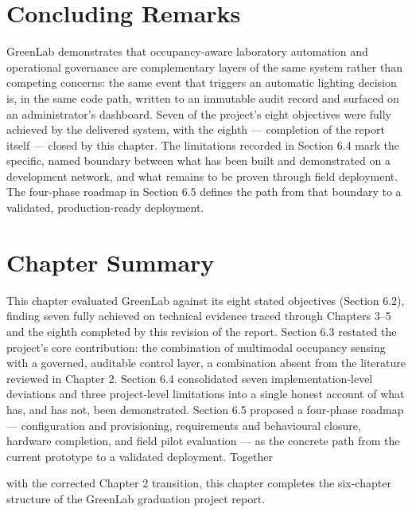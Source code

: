 \section{Concluding Remarks}


GreenLab demonstrates that occupancy-aware laboratory automation and operational
governance are complementary layers of the same system rather than competing
concerns: the same event that triggers an automatic lighting decision is, in the same code
path, written to an immutable audit record and surfaced on an administrator's
dashboard. Seven of the project's eight objectives were fully achieved by the delivered
system, with the eighth --- completion of the report itself --- closed by this chapter. The
limitations recorded in Section 6.4 mark the specific, named boundary between what has
been built and demonstrated on a development network, and what remains to be proven
through field deployment. The four-phase roadmap in Section 6.5 defines the path from
that boundary to a validated, production-ready deployment.


\section{Chapter Summary}


This chapter evaluated GreenLab against its eight stated objectives (Section 6.2), finding
seven fully achieved on technical evidence traced through Chapters 3--5 and the eighth
completed by this revision of the report. Section 6.3 restated the project's core
contribution: the combination of multimodal occupancy sensing with a governed,
auditable control layer, a combination absent from the literature reviewed in Chapter 2.
Section 6.4 consolidated seven implementation-level deviations and three project-level
limitations into a single honest account of what has, and has not, been demonstrated.
Section 6.5 proposed a four-phase roadmap --- configuration and provisioning,
requirements and behavioural closure, hardware completion, and field pilot evaluation
--- as the concrete path from the current prototype to a validated deployment. Together



with the corrected Chapter 2 transition, this chapter completes the six-chapter structure
of the GreenLab graduation project report.




